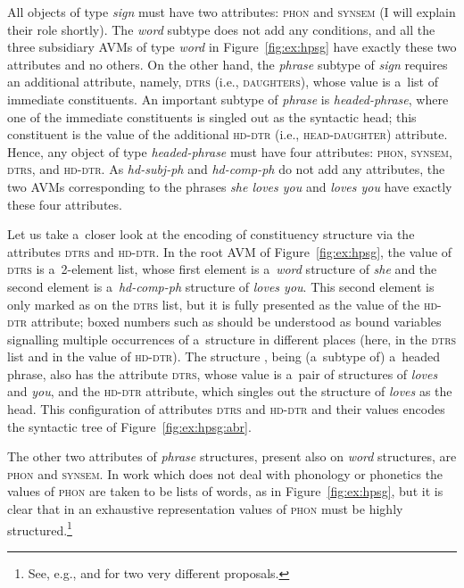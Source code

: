 \documentclass[output=paper,hidelinks]{langscibook}
\begin{document}
All objects of type \textit{sign} must have two attributes: \textsc{phon} and \textsc{synsem} (I will explain their role shortly).  The \textit{word} subtype does not add any conditions, and all the three subsidiary AVMs of type \textit{word} in Figure~\ref{fig:ex:hpsg} have exactly these two attributes and no others.  On the other hand, the \textit{phrase} subtype of \textit{sign} requires an additional attribute, namely, \textsc{dtrs} (i.e., \textsc{daughters}), whose value is a~list of immediate constituents.  An important subtype of \textit{phrase} is \textit{headed\hyp{}phrase}, where one of the immediate constituents is singled out as the syntactic head; this constituent is the value of the additional \textsc{hd-dtr} (i.e., \textsc{head\hyp{}daughter}) attribute.  Hence, any object of type \textit{headed\hyp{}phrase} must have four attributes: \textsc{phon}, \textsc{synsem}, \textsc{dtrs}, and \textsc{hd-dtr}.  As \textit{hd-subj-ph} and \textit{hd-comp-ph} do not add any attributes, the two AVMs corresponding to the phrases \emph{she loves you} and \emph{loves you} have exactly these four attributes.

Let us take a~closer look at the encoding of constituency structure via the attributes \textsc{dtrs} and \textsc{hd-dtr}.  In the root AVM of Figure~\ref{fig:ex:hpsg}, the value of \textsc{dtrs} is a~2-element list, whose first element is a~\textit{word} structure of \emph{she} and the second element is a~\textit{hd-comp-ph} structure of \emph{loves you}.  This second element is only marked as \avm{\1} on the \textsc{dtrs} list, but it is fully presented as the value of the \textsc{hd-dtr} attribute; boxed numbers such as \avm{\1} should be understood as bound variables signalling multiple occurrences of a~structure in different places (here, in the \textsc{dtrs} list and in the value of \textsc{hd-dtr}).  The structure \avm{\1}, being (a~subtype of) a~headed phrase, also has the attribute \textsc{dtrs}, whose value is a~pair of structures of \emph{loves} and \emph{you}, and the \textsc{hd-dtr} attribute, which singles out the structure of \emph{loves} as the head.  This configuration of attributes \textsc{dtrs} and \textsc{hd-dtr} and their values encodes the syntactic tree of Figure~\ref{fig:ex:hpsg:abr}.\label{page:1868}

The other two attributes of \textit{phrase} structures, present also on \textit{word} structures, are \textsc{phon} and \textsc{synsem}.  In work which does not deal with phonology or phonetics the values of \textsc{phon} are taken to be lists of words, as in Figure~\ref{fig:ex:hpsg}, but it is clear that in an exhaustive representation values of \textsc{phon} must be highly structured.\footnote{See, e.g., \citet{bir:kle:94} and \citet{hoeh:98} for two very different proposals.} 
\end{document}

